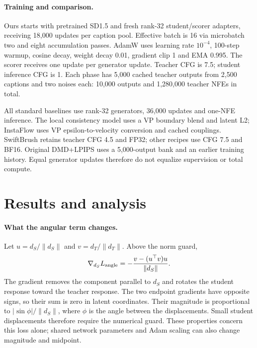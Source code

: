 \documentclass[10pt,twocolumn,letterpaper]{article}
\begin{document}
\paragraph{Training and comparison.}
Ours starts with pretrained SD1.5 and fresh rank-32 student/scorer adapters,
receiving 18,000 updates per caption pool. Effective batch is 16 via
microbatch two and eight accumulation passes. AdamW uses learning rate
$10^{-4}$, 100-step warmup, cosine decay, weight decay 0.01, gradient clip 1
and EMA 0.995. The scorer receives one update per generator update. Teacher
CFG is 7.5; student inference CFG is 1. Each phase has 5,000 cached teacher
outputs from 2,500 captions and two noises each: 10,000 outputs and
1,280,000 teacher NFEs in total.

All standard baselines use rank-32 generators, 36,000 updates and one-NFE
inference. The local consistency model uses a VP boundary blend and latent
L2; InstaFlow uses VP epsilon-to-velocity conversion and cached couplings.
SwiftBrush retains teacher CFG 4.5 and FP32; other recipes use CFG 7.5 and
BF16. Original DMD+LPIPS uses a 5,000-output bank and an earlier training
history. Equal generator updates therefore do not equalize supervision or
total compute. \CEMatchedControlStatus{}

\section{Results and analysis}
\begin{table}[t]
\centering\small

\caption{Full COCO-2017 validation: 5,000 generated and 5,000 real images.
All students use one NFE; the teacher uses 128. Baseline names denote our
local adapter recipes. Bold marks the best student metric.}
\label{tab:quality}
\end{table}


\begin{table}[t]
\centering\small

\caption{Full-validation changes: Ours minus DMD+LPIPS. Negative FID favors
Ours; negative IS and CLIP favor the reference. Teacher banks and
initialization histories differ between these recipes.}
\label{tab:metric_changes}
\end{table}

\paragraph{What the angular term changes.}
Let $u=d_S/\|d_S\|$ and $v=d_T/\|d_T\|$. Above the norm guard,
\begin{equation}
\nabla_{d_S}L_{\rm angle}
=-\frac{v-(u^\top v)u}{\|d_S\|}.
\end{equation}
The gradient removes the component parallel to $d_S$ and rotates the
student response toward the teacher response. The two endpoint gradients
have opposite signs, so their sum is zero in latent coordinates. Their
magnitude is proportional to $|\sin\phi|/\|d_S\|$, where $\phi$ is the angle
between the displacements. Small student displacements therefore require
the numerical guard. These properties concern this loss alone; shared
network parameters and Adam scaling can also change magnitude and midpoint.
\end{document}
